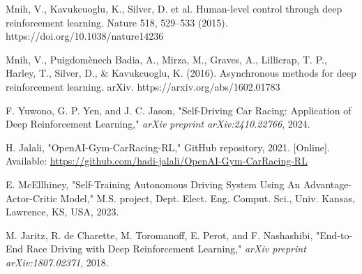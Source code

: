 \documentclass[conference]{IEEEtran}
\begin{document}
\begin{thebibliography}{00}
 Mnih, V., Kavukcuoglu, K., Silver, D. et al. Human-level control through deep reinforcement learning. Nature 518, 529–533 (2015). https://doi.org/10.1038/nature14236

 Mnih, V., Puigdomènech Badia, A., Mirza, M., Graves, A., Lillicrap, T. P., Harley, T., Silver, D., & Kavukcuoglu, K. (2016). Asynchronous methods for deep reinforcement learning. arXiv. https://arxiv.org/abs/1602.01783

F. Yuwono, G. P. Yen, and J. C. Jason, "Self-Driving Car Racing: Application of Deep Reinforcement Learning," \textit{arXiv preprint arXiv:2410.22766}, 2024.


H. Jalali, "OpenAI-Gym-CarRacing-RL," GitHub repository, 2021. [Online]. Available: \url{https://github.com/hadi-jalali/OpenAI-Gym-CarRacing-RL}

E. McEllhiney, "Self-Training Autonomous Driving System Using An Advantage-Actor-Critic Model," M.S. project, Dept. Elect. Eng. Comput. Sci., Univ. Kansas, Lawrence, KS, USA, 2023.

M. Jaritz, R. de Charette, M. Toromanoff, E. Perot, and F. Nashashibi, "End-to-End Race Driving with Deep Reinforcement Learning," \textit{arXiv preprint arXiv:1807.02371}, 2018.

\end{thebibliography}


\vspace{12pt}
\end{document}
